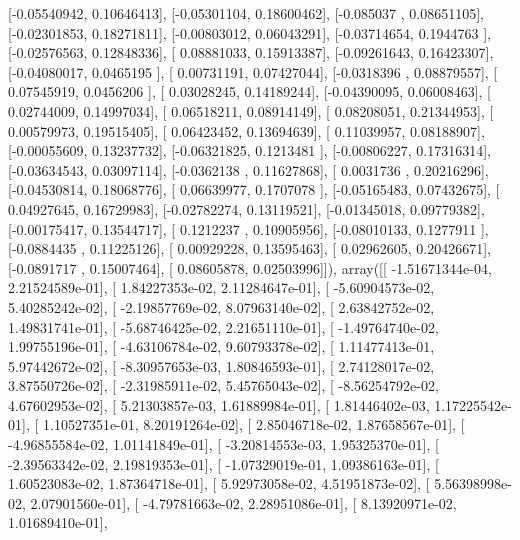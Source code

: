 \documentclass{article}
\begin{document}
       [-0.05540942,  0.10646413],
       [-0.05301104,  0.18600462],
       [-0.085037  ,  0.08651105],
       [-0.02301853,  0.18271811],
       [-0.00803012,  0.06043291],
       [-0.03714654,  0.1944763 ],
       [-0.02576563,  0.12848336],
       [ 0.08881033,  0.15913387],
       [-0.09261643,  0.16423307],
       [-0.04080017,  0.0465195 ],
       [ 0.00731191,  0.07427044],
       [-0.0318396 ,  0.08879557],
       [ 0.07545919,  0.0456206 ],
       [ 0.03028245,  0.14189244],
       [-0.04390095,  0.06008463],
       [ 0.02744009,  0.14997034],
       [ 0.06518211,  0.08914149],
       [ 0.08208051,  0.21344953],
       [ 0.00579973,  0.19515405],
       [ 0.06423452,  0.13694639],
       [ 0.11039957,  0.08188907],
       [-0.00055609,  0.13237732],
       [-0.06321825,  0.1213481 ],
       [-0.00806227,  0.17316314],
       [-0.03634543,  0.03097114],
       [-0.0362138 ,  0.11627868],
       [ 0.0031736 ,  0.20216296],
       [-0.04530814,  0.18068776],
       [ 0.06639977,  0.1707078 ],
       [-0.05165483,  0.07432675],
       [ 0.04927645,  0.16729983],
       [-0.02782274,  0.13119521],
       [-0.01345018,  0.09779382],
       [-0.00175417,  0.13544717],
       [ 0.1212237 ,  0.10905956],
       [-0.08010133,  0.1277911 ],
       [-0.0884435 ,  0.11225126],
       [ 0.00929228,  0.13595463],
       [ 0.02962605,  0.20426671],
       [-0.0891717 ,  0.15007464],
       [ 0.08605878,  0.02503996]]), array([[ -1.51671344e-04,   2.21524589e-01],
       [  1.84227353e-02,   2.11284647e-01],
       [ -5.60904573e-02,   5.40285242e-02],
       [ -2.19857769e-02,   8.07963140e-02],
       [  2.63842752e-02,   1.49831741e-01],
       [ -5.68746425e-02,   2.21651110e-01],
       [ -1.49764740e-02,   1.99755196e-01],
       [ -4.63106784e-02,   9.60793378e-02],
       [  1.11477413e-01,   5.97442672e-02],
       [ -8.30957653e-03,   1.80846593e-01],
       [  2.74128017e-02,   3.87550726e-02],
       [ -2.31985911e-02,   5.45765043e-02],
       [ -8.56254792e-02,   4.67602953e-02],
       [  5.21303857e-03,   1.61889984e-01],
       [  1.81446402e-03,   1.17225542e-01],
       [  1.10527351e-01,   8.20191264e-02],
       [  2.85046718e-02,   1.87658567e-01],
       [ -4.96855584e-02,   1.01141849e-01],
       [ -3.20814553e-03,   1.95325370e-01],
       [ -2.39563342e-02,   2.19819353e-01],
       [ -1.07329019e-01,   1.09386163e-01],
       [  1.60523083e-02,   1.87364718e-01],
       [  5.92973058e-02,   4.51951873e-02],
       [  5.56398998e-02,   2.07901560e-01],
       [ -4.79781663e-02,   2.28951086e-01],
       [  8.13920971e-02,   1.01689410e-01],
\end{document}
